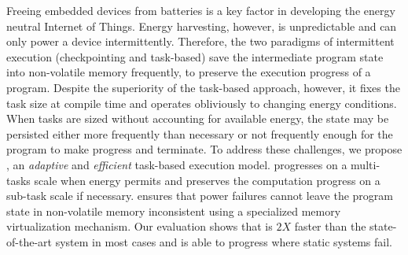 %
Freeing embedded devices from batteries is a key factor in developing the energy neutral Internet of Things. 
Energy harvesting, however, is unpredictable and can only power a device intermittently. Therefore, the two paradigms of intermittent execution (checkpointing and task-based) save the intermediate program state into non-volatile memory frequently, to preserve the execution progress of a program. Despite the superiority of the task-based approach, however, it fixes the task size at compile time and operates obliviously to changing energy conditions. When tasks are sized without accounting for available energy, the state may be persisted either more frequently than necessary or not frequently enough for the program to make progress and terminate.%
To address these challenges, we propose \sys, an \emph{adaptive} and \emph{efficient} task-based execution model. \sys progresses on a multi-tasks scale when energy permits and preserves the computation progress on a sub-task scale if necessary. \sys ensures that power failures cannot leave the program state in non-volatile memory inconsistent using a specialized memory virtualization mechanism. Our evaluation shows that \sys is $2X$ faster than the state-of-the-art system in most cases and is able to progress where static systems fail. 